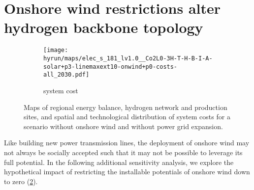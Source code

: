 
\section*{Onshore wind restrictions alter hydrogen backbone topology}
\label{sec:onwind}

\begin{figure}
    \centering
    \begin{subfigure}[t]{0.6\textwidth}
        \centering
        \caption{system cost}
        \texttt{[image: \\hyrun/maps/elec\_s\_181\_lv1.0\_\_Co2L0-3H-T-H-B-I-A-solar+p3-linemaxext10-onwind+p0-costs-all\_2030.pdf]}
        \label{fig:no-onw:tsc}
    \end{subfigure}
    \caption{Maps of regional energy balance, hydrogen network and production sites, and spatial and technological distribution of system costs for a scenario without onshore wind and without power grid expansion.}
    \label{fig:no-onw}
\end{figure}


Like building new power transmission lines, the deployment of onshore wind may
not always be socially accepted such that it may not be possible to leverage its
full potential. In the following additional sensitivity analysis, we explore the
hypothetical impact of restricting the installable potentials of onshore wind
down to zero (\cref{fig:no-onw}).

